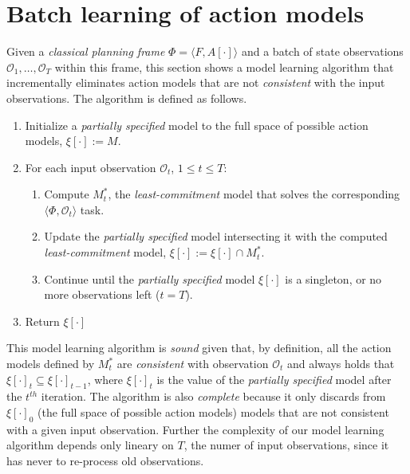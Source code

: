 \documentclass{article}
\newcommand{\tup}[1]{{\langle #1 \rangle}}
\begin{document}
\section{Batch learning of action models}
Given a {\em classical planning frame} $\Phi=\tup{F,A[\cdot]}$ and a batch of state observations $\mathcal{O}_1,\ldots,\mathcal{O}_T$ within this frame, this section shows a model learning algorithm that incrementally eliminates action models that are not {\em consistent} with the input observations. The algorithm is defined as follows. 
\begin{enumerate}
\item Initialize a {\em partially specified} model to the full space of possible action models, $\xi[\cdot]:=M$.
\item For each input observation $\mathcal{O}_t$, {\tt\small $1\leq t\leq T$}:
\begin{enumerate}
\item Compute $M^*_t$, the {\em least-commitment} model that solves the corresponding $\tup{\Phi,\mathcal{O}_t}$ task.
\item Update the {\em partially specified} model intersecting it with the computed {\em least-commitment} model, $\xi[\cdot]:=\xi[\cdot]\cap M^*_t$.
\item Continue until the {\em partially specified} model $\xi[\cdot]$ is a singleton, or no more observations left ($t=T$).
\end{enumerate}
\item Return $\xi[\cdot]$
\end{enumerate}

This model learning algorithm is {\em sound} given that, by definition, all the action models defined by $M^*_t$ are {\em consistent} with observation $\mathcal{O}_t$ and always holds that $\xi[\cdot]_t\subseteq \xi[\cdot]_{t-1}$, where $\xi[\cdot]_t$ is the value of the {\em partially specified} model after the $t^{th}$ iteration. The algorithm is also {\em complete} because it only discards from $\xi[\cdot]_0$ (the full space of possible action models) models that are not consistent with a given input observation. Further the complexity of our model learning algorithm depends only lineary on $T$, the numer of input observations, since it has never to re-process old observations.

\end{document}
